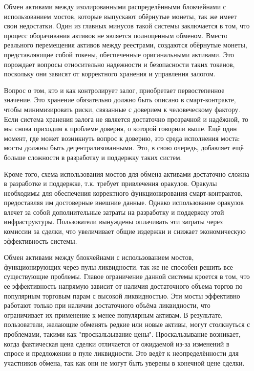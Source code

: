 Обмен активами между изолированными распределёнными блокчейнами с использованием мостов, которые выпускают обёрнутые монеты, так же имеет свои недостатки. Один из главных минусов такой системы заключается в том, что процесс оборачивания активов не является полноценным обменом. Вместо реального перемещения активов между реестрами, создаются обёрнутые монеты, представляющие собой токены, обеспеченные оригинальными активами. Это порождает вопросы относительно надежности и безопасности таких токенов, поскольку они зависят от корректного хранения и управления залогом.

Вопрос о том, кто и как контролирует залог, приобретает первостепенное значение. Это хранение обязательно должно быть описано в смарт-контракте, чтобы минимизировать риски, связанные с доверием к человеческому фактору. Если система хранения залога не является достаточно прозрачной и надёжной, то мы снова приходим к проблеме доверия, о которой говорили выше. Ещё один момент, где может возникнуть вопрос к доверию, это среда исполнения моста: мосты должны быть децентрализованными. Это, в свою очередь, добавляет ещё больше сложности в разработку и поддержку таких систем.

Кроме того, схема использования мостов для обмена активами достаточно сложна в разработке и поддержке, т.к. требует привлечения оракулов. Оракулы необходимы для обеспечения корректного функционирования смарт-контрактов, предоставляя им достоверные внешние данные. Однако использование оракулов влечет за собой дополнительные затраты на разработку и поддержку этой инфраструктуры. Пользователи вынуждены оплачивать эти затраты через комиссии за сделки, что увеличивает общие издержки и снижает экономическую эффективность системы.

Обмен активами между блокчейнами с использованием мостов, функционирующих через пулы ликвидности, так же не способен решить все существующие проблемы. Главое ограничение данной системы кроется в том, что ее эффективность напрямую зависит от наличия достаточного объема торгов по популярным торговым парам с высокой ликвидностью. Эти мосты эффективно работают только при наличии достаточного объёма ликвидности, что ограничивает их применение к менее популярным активам. В результате, пользователи, желающие обменять редкие или новые активы, могут столкнуться с проблемами, такими как "проскальзывание цены". Проскальзывание возникает, когда фактическая цена сделки отличается от ожидаемой из-за изменений в спросе и предложении в пуле ликвидности. Это ведёт к неопределённости для участников обмена, так как они не могут быть уверены в конечной цене сделки.

